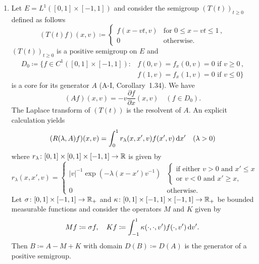 \begin{examples}
\begin{enumerate}[\upshape (i), wide, labelindent=.5em]
	\item 
	Let $E = L^{1}([0,1]\times[-1,1])$ and consider the semigroup $(T(t))_{t\geq 0}$ defined as follows
	\begin{equation}\label{eq:c3-3.3}
		(T(t)f)(x,v) \coloneqq \begin{cases}
			f(x-vt,v) & \text{for } 0 \leq x-vt \leq 1 \,,\\
			0 & \text{otherwise}.
		\end{cases}
	\end{equation}
		$(T(t))_{t\geq 0}$ is a positive semigroup on $E$ and
	\begin{align*}\label{eq:c3-D0}
		D_{0} \coloneqq \{f \in C^{1}([0,1]\times[-1,1]) \colon  
		& f(0,v) = f_{x}(0,v) = 0 \text{ if } v \geq 0\,,\\ 
		& f(1,v) = f_{x}(1,v) = 0 \text{ if } v \leq 0\}
	\end{align*}
	is a core for its generator $A$ (\cf A-I, Corollary~1.34).
	We have
	\begin{equation}\label{eq:c3-3.4}
		(Af)(x,v) = -v\frac{\partial f}{\partial x}(x,v) \quad (f \in D_{0}).
	\end{equation}
	The Laplace transform of $(T(t))$ is the resolvent of $A$.
	An explicit calculation yields
	\begin{equation}\label{eq:c3-3.5}
		(R(\lambda,A)f)(x,v) = \int_{0}^{1} r_{\lambda}(x,x',v)f(x',v)\mathop{}\!\mathrm{d}{x}' \quad (\lambda > 0)
	\end{equation}
	where $r_{\lambda} \colon [0,1] \times [0,1] \times [-1,1] \to \mathbb{R} $ is given by
	\begin{equation*}\label{eq:c3-r_lambda}
		r_{\lambda}(x,x',v) = \begin{cases}
			|v|^{-1}\exp(-\lambda(x-x')v^{-1}) & 
			\begin{cases}\text{if either } v>0 \text{ and } x'\leq x \\
		    \text{or } v<0 \text{ and } x'\geq x, 
		    \end{cases}\\
			0 & \text{otherwise}.
		\end{cases}
	\end{equation*}
	Let $\sigma \colon [0,1]\times[-1,1] \to \mathbb{R} _{+}$ and $\kappa \colon [0,1]\times[-1,1]\times[-1,1] \to \mathbb{R} _{+}$ be bounded measurable functions and consider the operators $M$ and $K$ given by
	\begin{equation}\label{eq:c3-3.6}
		Mf \coloneqq \sigma f, \quad Kf \coloneqq \int_{-1}^{1} \kappa(\cdot,\cdot,v')f(\cdot,v') \mathop{}\!\mathrm{d}{v'}.
	\end{equation}
	Then $B \coloneqq A - M + K$ with domain $D(B) \coloneqq D(A)$ is the generator of a positive semigroup.
	

\end{enumerate}
\end{examples}
